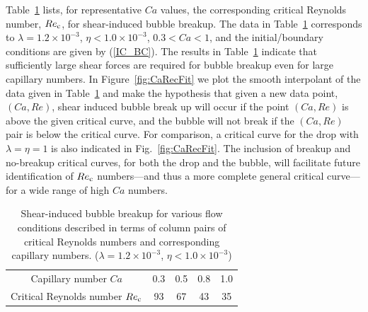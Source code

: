 \documentclass{elsarticle}
\begin{document}
Table~\ref{tab:CaRecComparison} lists, for representative $Ca$ values, the
corresponding critical Reynolds number, $Re_{\rm c}$, for shear-induced bubble
breakup.  The data in Table~\ref{tab:CaRecComparison} corresponds to $\lambda =
1.2 \times 10^{-3}$, $\eta < 1.0 \times 10^{-3}$, $0.3<Ca<1$, and the
initial/boundary conditions are given by (\ref{IC_BC}).  The results in
Table~\ref{tab:CaRecComparison} indicate that sufficiently large shear forces
are required for bubble breakup even for large capillary numbers.  In
Figure~\ref{fig:CaRecFit} we plot the smooth interpolant of the data given in
Table~\ref{tab:CaRecComparison} and make the hypothesis that given a new data
point, $(Ca,Re)$,  shear induced bubble break up will occur if the point
$(Ca,Re)$ is above the given critical curve, and the bubble will not break if
the $(Ca,Re)$ pair is below the critical curve.  For comparison,
a critical curve for the drop with $\lambda =\eta = 1$ is also indicated in
Fig.~\ref{fig:CaRecFit}.  The inclusion of breakup and no-breakup critical
curves, for both the drop and the bubble, will facilitate future identification
of $Re_{\rm c}$ numbers---and thus a more complete general critical curve---for
a wide range of high $Ca$ numbers.

\begin{table}[tbh]
\caption{Shear-induced bubble breakup for various flow 
	conditions described in terms
        of column pairs of critical Reynolds numbers and 
	corresponding capillary numbers.
        ($\lambda = 1.2 \times 10^{-3}$, $\eta < 1.0 \times 10^{-3}$) 
	}
\label{tab:CaRecComparison}
\footnotesize
\center
\begin{tabular}{ c  c  c  c  c }
\hline
\hline
Capillary number $Ca$            & 0.3  & 0.5  & 0.8  & 1.0  \\
Critical Reynolds number $Re_{\rm c}$  & 93   & 67   & 43   & 35   \\
\hline
\hline
\end{tabular}
\end{table}
\end{document}
